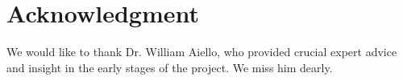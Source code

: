 \documentclass[10pt,conference, compsocconf]{IEEEtran}
\begin{document}
	
	\maketitle
	
	\acresetall	%
	
	
	
	
	
	
	
	
	
	
	
	
	\section*{Acknowledgment}
	We would like to thank Dr. William Aiello, who provided crucial expert advice and insight in the early
	stages of the project. We miss him dearly.
	
	
\end{document}
